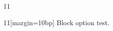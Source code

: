 \documentclass[paper=A4]{ropas-poster}
\begin{document}
\begin{postergrid}{1}{1}
\begin{posterblock}{1}{1}[margin=10bp]
Block option test.
\end{posterblock}
\end{postergrid}
\end{document}
